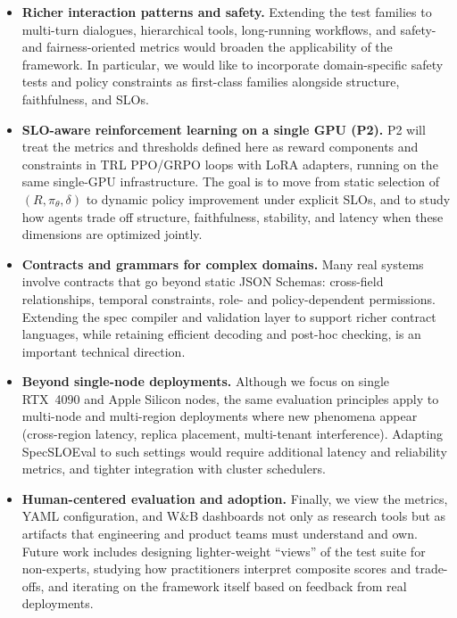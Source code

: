 \begin{itemize}[leftmargin=12pt]
    \item \textbf{Richer interaction patterns and safety.}
    Extending the test families to multi-turn dialogues, hierarchical tools, long-running workflows, and safety- and fairness-oriented metrics would broaden the applicability of the framework.
    In particular, we would like to incorporate domain-specific safety tests and policy constraints as first-class families alongside structure, faithfulness, and SLOs.

    \item \textbf{SLO-aware reinforcement learning on a single GPU (P2).}
    P2 will treat the metrics and thresholds defined here as reward components and constraints in TRL PPO/GRPO loops with LoRA adapters, running on the same single-GPU infrastructure.
    The goal is to move from static selection of $(R,\pi_\theta,\delta)$ to dynamic policy improvement under explicit SLOs, and to study how agents trade off structure, faithfulness, stability, and latency when these dimensions are optimized jointly.

    \item \textbf{Contracts and grammars for complex domains.}
    Many real systems involve contracts that go beyond static JSON Schemas: cross-field relationships, temporal constraints, role- and policy-dependent permissions.
    Extending the spec compiler and validation layer to support richer contract languages, while retaining efficient decoding and post-hoc checking, is an important technical direction.

    \item \textbf{Beyond single-node deployments.}
    Although we focus on single RTX~4090 and Apple Silicon nodes, the same evaluation principles apply to multi-node and multi-region deployments where new phenomena appear (cross-region latency, replica placement, multi-tenant interference).
    Adapting SpecSLOEval to such settings would require additional latency and reliability metrics, and tighter integration with cluster schedulers.

    \item \textbf{Human-centered evaluation and adoption.}
    Finally, we view the metrics, YAML configuration, and W\&B dashboards not only as research tools but as artifacts that engineering and product teams must understand and own.
    Future work includes designing lighter-weight “views” of the test suite for non-experts, studying how practitioners interpret composite scores and trade-offs, and iterating on the framework itself based on feedback from real deployments.
\end{itemize}

